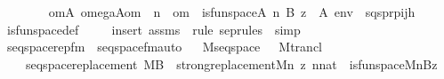 \begin{isabellebody}
\ \ \ \isanewline
\ \ \ \ {\isachardoublequoteopen}{\isacharparenleft}{\kern0pt}{\isasymexists}om{\isasymin}A{\isachardot}{\kern0pt}\ omega{\isacharparenleft}{\kern0pt}{\isacharhash}{\kern0pt}{\isacharhash}{\kern0pt}A{\isacharcomma}{\kern0pt}om{\isacharparenright}{\kern0pt}\ {\isasymand}\ n\ {\isasymin}\ om\ {\isasymand}\ is{\isacharunderscore}{\kern0pt}funspace{\isacharparenleft}{\kern0pt}{\isacharhash}{\kern0pt}{\isacharhash}{\kern0pt}A{\isacharcomma}{\kern0pt}\ n{\isacharcomma}{\kern0pt}\ B{\isacharcomma}{\kern0pt}\ z{\isacharparenright}{\kern0pt}{\isacharparenright}{\kern0pt}\ {\isasymlongleftrightarrow}\ {\isacharparenleft}{\kern0pt}A{\isacharcomma}{\kern0pt}\ env\ {\isasymTurnstile}\ {\isacharparenleft}{\kern0pt}{\isacharquery}{\kern0pt}sqsprp{\isacharparenleft}{\kern0pt}i{\isacharcomma}{\kern0pt}j{\isacharcomma}{\kern0pt}h{\isacharparenright}{\kern0pt}{\isacharparenright}{\kern0pt}{\isacharparenright}{\kern0pt}{\isachardoublequoteclose}\isanewline
%
\isadelimproof
\ \ %
\endisadelimproof
%
\isatagproof
{}\isamarkupfalse%
\ is{\isacharunderscore}{\kern0pt}funspace{\isacharunderscore}{\kern0pt}def\ \isanewline
\ \ \isamarkupfalse%
\ {\isacharparenleft}{\kern0pt}insert\ assms\ {\isacharsemicolon}{\kern0pt}\ {\isacharparenleft}{\kern0pt}rule\ sep{\isacharunderscore}{\kern0pt}rules\ {\isacharbar}{\kern0pt}\ simp{\isacharparenright}{\kern0pt}{\isacharplus}{\kern0pt}{\isacharparenright}{\kern0pt}%
\endisatagproof
{\isafoldproof}%
%
\isadelimproof
\isanewline
%
\endisadelimproof
%
\isadelimML
\isanewline
%
\endisadelimML
%
\isatagML
{}\isamarkupfalse%
\ {\isachardoublequoteopen}seqspace{\isacharunderscore}{\kern0pt}rep{\isacharunderscore}{\kern0pt}fm{\isachardoublequoteclose}\ \ seqspace{\isacharunderscore}{\kern0pt}fm{\isacharunderscore}{\kern0pt}auto%
\endisatagML
{\isafoldML}%
%
\isadelimML
\isanewline
%
\endisadelimML
\ \isanewline
{}\isamarkupfalse%
\ M{\isacharunderscore}{\kern0pt}seqspace\ {\isacharequal}{\kern0pt}\ \ M{\isacharunderscore}{\kern0pt}trancl\ {\isacharplus}{\kern0pt}\isanewline
\ \ \ \isanewline
\ \ \ \ seqspace{\isacharunderscore}{\kern0pt}replacement{\isacharcolon}{\kern0pt}\ {\isachardoublequoteopen}M{\isacharparenleft}{\kern0pt}B{\isacharparenright}{\kern0pt}\ {\isasymLongrightarrow}\ strong{\isacharunderscore}{\kern0pt}replacement{\isacharparenleft}{\kern0pt}M{\isacharcomma}{\kern0pt}{\isasymlambda}n\ z{\isachardot}{\kern0pt}\ n{\isasymin}nat\ {\isasymand}\ is{\isacharunderscore}{\kern0pt}funspace{\isacharparenleft}{\kern0pt}M{\isacharcomma}{\kern0pt}n{\isacharcomma}{\kern0pt}B{\isacharcomma}{\kern0pt}z{\isacharparenright}{\kern0pt}{\isacharparenright}{\kern0pt}{\isachardoublequoteclose}\isanewline

\end{isabellebody}
